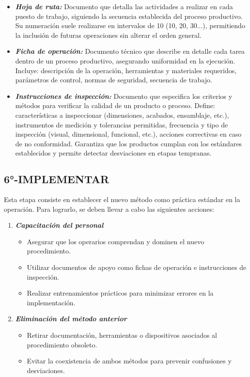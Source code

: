 \documentclass[a4paper,oneside,11pt]{article}
\begin{document}
\begin{itemize}
    \item \textbf{\textit{Hoja de ruta:}} Documento que detalla las actividades a realizar en cada puesto de trabajo, siguiendo la secuencia establecida del proceso productivo. Su numeración suele realizarse en intervalos de 10 (10, 20, 30...), permitiendo la inclusión de futuras operaciones sin alterar el orden general.

    \item \textbf{\textit{Ficha de operación:}} Documento técnico que describe en detalle cada tarea dentro de un proceso productivo, asegurando uniformidad en la ejecución. Incluye: descripción de la operación, herramientas y materiales requeridos, parámetros de control, normas de seguridad, secuencia de trabajo.

    \item \textbf{\textit{Instrucciones de inspección:}} Documento que especifica los criterios y métodos para verificar la calidad de un producto o proceso. Define: características a inspeccionar (dimensiones, acabados, ensamblaje, etc.), instrumentos de medición y tolerancias permitidas, frecuencia y tipo de inspección (visual, dimensional, funcional, etc.), acciones correctivas en caso de no conformidad. Garantiza que los productos cumplan con los estándares establecidos y permite detectar desviaciones en etapas tempranas.
\end{itemize}


\subsection{6°-IMPLEMENTAR}

Esta etapa consiste en establecer el nuevo método como práctica estándar en la operación. Para lograrlo, se deben llevar a cabo las siguientes acciones:

\begin{enumerate}
    \item \textbf{\textit{Capacitación del personal}}
    \begin{itemize}
        \item Asegurar que los operarios comprendan y dominen el nuevo procedimiento.
        \item Utilizar documentos de apoyo como fichas de operación e instrucciones de inspección.
        \item Realizar entrenamientos prácticos para minimizar errores en la implementación.
    \end{itemize}
    \item \textbf{\textit{Eliminación del método anterior}}
    \begin{itemize}
        \item Retirar documentación, herramientas o dispositivos asociados al procedimiento obsoleto.
        \item Evitar la coexistencia de ambos métodos para prevenir confusiones y desviaciones.
    \end{itemize}
\end{enumerate}
\end{document}
